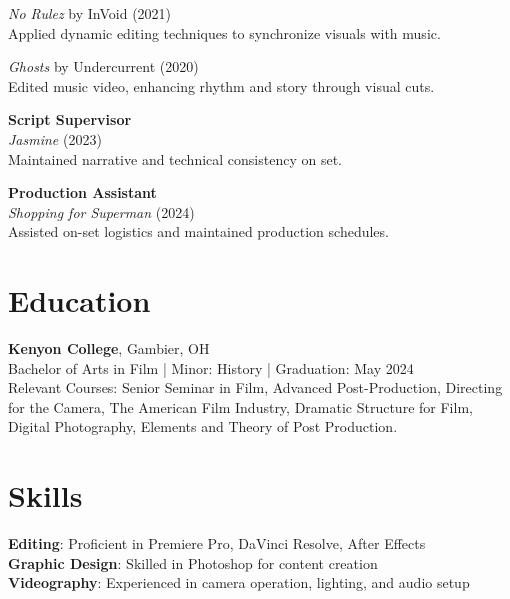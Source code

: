 \documentclass[letterpaper,11pt]{article}
\begin{document}
\textit{No Rulez} by InVoid (2021) \\
Applied dynamic editing techniques to synchronize visuals with music.

\textit{Ghosts} by Undercurrent (2020) \\
Edited music video, enhancing rhythm and story through visual cuts.

\vspace{0.5em} %

\textbf{Script Supervisor} \\
\textit{Jasmine} (2023) \\
Maintained narrative and technical consistency on set.

\vspace{0.5em} %

\textbf{Production Assistant} \\
\textit{Shopping for Superman} (2024) \\
Assisted on-set logistics and maintained production schedules.

\section*{Education}
\textbf{Kenyon College}, Gambier, OH\\
Bachelor of Arts in Film | Minor: History | Graduation: May 2024\\
Relevant Courses: Senior Seminar in Film, Advanced Post-Production, Directing for the Camera, The American Film Industry, Dramatic Structure for Film, Digital Photography, Elements and Theory of Post Production.

\section*{Skills}
\textbf{Editing}: Proficient in Premiere Pro, DaVinci Resolve, After Effects\\
\textbf{Graphic Design}: Skilled in Photoshop for content creation\\
\textbf{Videography}: Experienced in camera operation, lighting, and audio setup
\end{document}
